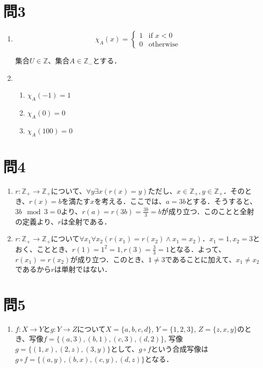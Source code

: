 \documentclass[uplatex]{jsarticle}
\begin{document}
\section{問3}
		\begin{enumerate}
			\item
			\[
                                \chi_A(x) = \left\{
                                \begin{array}{ll}
                                    1 & \text{if } x < 0  \\
                                    0  & \text{otherwise}
                                \end{array}
                                \right.
            \]
			
			集合$U \in \mathbb{Z}$、集合$A \in \mathbb{Z_-}$とする．

			\item
			    \begin{enumerate}
				    \item 
				        $\chi_A(-1) = 1$
			        \item
				        $\chi_A(0) = 0$
			        \item
				        $\chi_A(100) = 0$
				\end{enumerate}
		\end{enumerate}

\section{問4}
	\begin{enumerate}
		\item $r:\mathbb{Z}_+ \rightarrow \mathbb{Z}_+$について、$\forall y \exists x ( r (x) = y )$ただし、$x \in \mathbb{Z}_+, y \in \mathbb{Z}_+$．そのとき、$r(x) = b$を満たす$x$を考える．ここでは、$ a = 3b$とする．そうすると、$3b \mod 3 = 0 $より、$r(a) = r(3b) = \frac{3b}{3} = b$が成り立つ．このことと全射の定義より、$r$は全射である．
		\item $r:\mathbb{Z}_+ \rightarrow \mathbb{Z}_+$について$\forall x_1 \forall x_2 (r(x_1) = r(x_2) \land x_1 = x_2 )$．$x_1 = 1, x_2 = 3$とおく、こととき、$r(1) = 1^2 = 1, r(3) = \frac{3}{3} = 1$となる．よって、$r(x_1) = r(x_2)$が成り立つ．このとき、$1 \neq 3$であることに加えて、$ x_1 \neq x_2 $であるから$r$は単射ではない．
	\end{enumerate}

\section{問5}
	\begin{enumerate}
		\item  $f:X \rightarrow Y$と$g:Y \rightarrow Z$について$X=\{a,b,c,d\}$, $Y=\{1,2,3\}$, $Z=\{z,x,y\}$のとき、写像$f=\{(a,3),(b,1),(c,3),(d,2)\}$, 写像$g=\{(1,x),(2,z),(3,y)\}$として、$g \circ f$という合成写像は$g \circ f = \{(a,y),(b,x),(c,y),(d,z)\}$となる．
	\end{enumerate}
\end{document}
